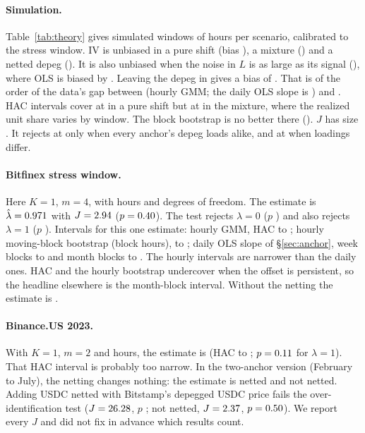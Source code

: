 \paragraph{Simulation.} Table~\ref{tab:theory} gives \NumGSimReps{} simulated windows of \NumGSimHours{} hours per scenario,
calibrated to the stress window. IV is unbiased in a pure shift (bias \NumGSOneBiasIv{}), a mixture (\NumGSThreeBiasIv{}) and a
netted depeg (\NumGSFiveBiasIv{}). It is also unbiased when the noise in $L$ is as large as its signal (\NumGSSixBiasIv{}),
where OLS is biased by \NumGSSixBiasOls{}. Leaving the depeg in gives a bias of \NumGSFourBiasIv{}. That is of the order of
the data's gap between \NumGBfxNaiveLam{} (hourly GMM; the daily OLS slope is \NumKStressDaySlopeD{}) and
\NumGBfxPrimaryLam{}. HAC intervals cover at \NumGSOneCover{} in a pure shift but at \NumGSThreeCover{} in the mixture, where
the realized unit share varies by window. The block bootstrap is no better there (\NumGSThreeCoverBoot{}). $J$ has size
\NumGSOneJRej{}. It rejects at only \NumGSFourJRej{} when every anchor's depeg loads alike, and at \NumGSSevenJRej{} when
loadings differ.

\paragraph{Bitfinex stress window.} Here $K=1$, $m=4$, with \NumGBfxPrimaryN{} hours and \NumGBfxPrimaryJDf{} degrees of
freedom. The estimate is $\hat\lambda=0.971{}$ with $J=2.94{}$ ($p=0.40{}$).
The test rejects $\lambda=0$ ($p$ \NumGBfxPrimaryPZero{}) and also rejects $\lambda=1$ ($p$ \NumGBfxPrimaryPOne{}).
Intervals for this one estimate: hourly GMM, HAC \NumGBfxPrimaryLo{} to \NumGBfxPrimaryHi{}; hourly moving-block bootstrap
(block \NumGBfxBootBlock{} hours), \NumGBfxBootLo{} to \NumGBfxBootHi{}; daily OLS slope of \S\ref{sec:anchor}, week blocks
\NumKStressDaySlopeAdjWkLo{} to \NumKStressDaySlopeAdjWkHi{} and month blocks \NumKStressDaySlopeAdjMoLo{} to
\NumKStressDaySlopeAdjMoHi{}. The hourly intervals are narrower than the daily ones. HAC and the hourly bootstrap
undercover when the offset is persistent, so the headline elsewhere is the month-block interval. Without the netting the
estimate is \NumGBfxNaiveLam{}.

\paragraph{Binance.US 2023.} With $K=1$, $m=2$ and \NumGBusUsdtN{} hours, the estimate is \NumGBusUsdtLam{} (HAC
\NumGBusUsdtLo{} to \NumGBusUsdtHi{}; $p=0.11{}$ for $\lambda=1$). That HAC interval is probably too narrow.
In the two-anchor version (February to July), the netting changes nothing: the estimate is \NumGBusTwoLam{} netted and
\NumGBusTwoRawLam{} not netted. Adding USDC netted with Bitstamp's depegged USDC price fails the over-identification test
($J=26.28{}$, $p$ \NumGBusTwoJP{}; not netted, $J=2.37{}$, $p=0.50{}$). We report every $J$
and did not fix in advance which results count.
